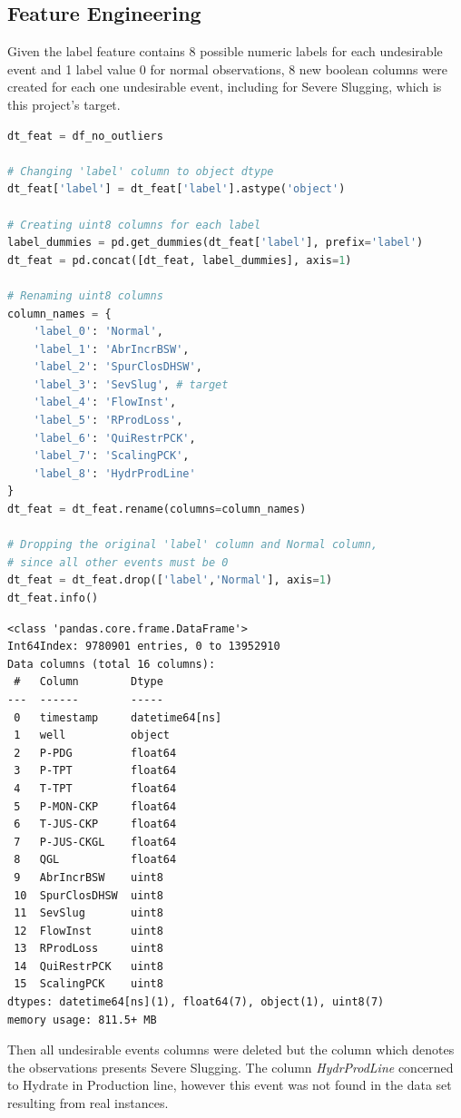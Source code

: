 \documentclass{article}
\begin{document}
\subsection{Feature Engineering}

Given the label feature contains 8 possible numeric labels for each undesirable event and 1 label value 0 for normal observations, 8 new boolean columns were created for each one undesirable event, including for Severe Slugging, which is this project's target.

\begin{lstlisting}[language=Python]
dt_feat = df_no_outliers

# Changing 'label' column to object dtype
dt_feat['label'] = dt_feat['label'].astype('object') 

# Creating uint8 columns for each label
label_dummies = pd.get_dummies(dt_feat['label'], prefix='label')
dt_feat = pd.concat([dt_feat, label_dummies], axis=1)

# Renaming uint8 columns
column_names = {
    'label_0': 'Normal',
    'label_1': 'AbrIncrBSW',
    'label_2': 'SpurClosDHSW',
    'label_3': 'SevSlug', # target
    'label_4': 'FlowInst',
    'label_5': 'RProdLoss',
    'label_6': 'QuiRestrPCK',
    'label_7': 'ScalingPCK',
    'label_8': 'HydrProdLine'
}
dt_feat = dt_feat.rename(columns=column_names)

# Dropping the original 'label' column and Normal column, 
# since all other events must be 0
dt_feat = dt_feat.drop(['label','Normal'], axis=1)
dt_feat.info()
\end{lstlisting}
\begin{verbatim}
<class 'pandas.core.frame.DataFrame'>
Int64Index: 9780901 entries, 0 to 13952910
Data columns (total 16 columns):
 #   Column        Dtype         
---  ------        -----         
 0   timestamp     datetime64[ns]
 1   well          object        
 2   P-PDG         float64       
 3   P-TPT         float64       
 4   T-TPT         float64       
 5   P-MON-CKP     float64       
 6   T-JUS-CKP     float64       
 7   P-JUS-CKGL    float64       
 8   QGL           float64       
 9   AbrIncrBSW    uint8         
 10  SpurClosDHSW  uint8         
 11  SevSlug       uint8         
 12  FlowInst      uint8         
 13  RProdLoss     uint8         
 14  QuiRestrPCK   uint8         
 15  ScalingPCK    uint8         
dtypes: datetime64[ns](1), float64(7), object(1), uint8(7)
memory usage: 811.5+ MB
\end{verbatim}

Then all undesirable events columns were deleted but the column which denotes the observations presents Severe Slugging. The column \emph{HydrProdLine} concerned to Hydrate in Production line, however this event was not found in the data set resulting from real instances.
\end{document}
